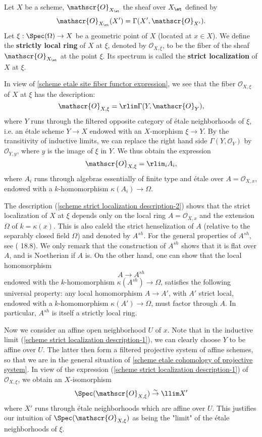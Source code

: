 \begin{definition}
Let $X$ be a scheme, $\mathscr{O}_{X_\et}$ the sheaf over $X_{\et}$ defined by
\[\mathscr{O}_{X_\et}(X')=\Gamma(X',\mathscr{O}_{X'}).\]
Let $\xi:\Spec(\Omega)\to X$ be a geometric point of $X$ (located at $x\in X$). We define the \textbf{strictly local ring} of $X$ at $\xi$, denoted by $\mathscr{O}_{X,\xi}$, to be the fiber of the sheaf $\mathscr{O}_{X_\et}$ at the point $\xi$. Its spectrum is called the \textbf{strict localization} of $X$ at $\xi$.
\end{definition}
In view of \cref{scheme etale site fiber functor expression}, we see that the fiber $\mathscr{O}_{X,\xi}$ of $X$ at $\xi$ has the description:
\begin{equation}\label{scheme strict localization description-1}
\mathscr{O}_{X,\xi}=\rlim\Gamma(Y,\mathscr{O}_Y),
\end{equation}
where $Y$ runs through the filtered opposite category of \'etale neighborhoods of $\xi$, i.e. an \'etale scheme $Y\to X$ endowed with an $X$-morphism $\xi\to Y$. By the transitivity of inductive limits, we can replace the right hand side $\Gamma(Y,\mathscr{O}_Y)$ by $\mathscr{O}_{Y,y}$, where $y$ is the image of $\xi$ in $Y$. We thus obtain the expression
\begin{equation}\label{scheme strict localization description-2}
\mathscr{O}_{X,\xi}=\rlim_iA_i,
\end{equation}
where $A_i$ runs through algebras essentially of finite type and \'etale over $A=\mathscr{O}_{X,x}$, endowed with a $k$-homomorphism $\kappa(A_i)\to\Omega$.\par
The description (\ref{scheme strict localization description-2}) shows that the strict localization of $X$ at $\xi$ depends only on the local ring $A=\mathscr{O}_{X,x}$ and the extension $\Omega$ of $k=\kappa(x)$. This is also caleld the strict henselization of $A$ (relative to the separably closed field $\Omega$) and denoted by $A^{sh}$. For the general properties of $A^{sh}$, see (\cite{EGA4-4} 18.8). We only remark that the construction of $A^{sh}$ shows that it is flat over $A$, and is Noetherian if $A$ is. On the other hand, one can show that the local homomorphism
\[A\to A^{sh}\]
endowed with the $k$-homomorphism $\kappa(A^{sh})\to\Omega$, satisfies the following universal property: any local homomorphism $A\to A'$, with $A'$ strict local, endowed with a $k$-homomorphism $\kappa(A')\to\Omega$, must factor through $A$. In particular, $A^{sh}$ is itself a strictly local ring.\par
Now we consider an affine open neighborhood $U$ of $x$. Note that in the inductive limit (\ref{scheme strict localization description-1}), we can clearly choose $Y$ to be affine over $U$. The latter then form a filtered projective system of affine schemes, so that we are in the general situation of \autoref{scheme etale cohomology of projective system}. In view of the expression (\ref{scheme strict localization description-1}) of $\mathscr{O}_{X,\xi}$, we obtain an $X$-isomorphism
\[\Spec(\mathscr{O}_{X,\xi})\stackrel{\sim}{\to}\llim X'\]
where $X'$ runs through \'etale neighborhoods which are affine over $U$. This justifies our intuition of $\Spec(\mathscr{O}_{X,\xi})$ as being the "limit" of the \'etale neighborhoods of $\xi$.

